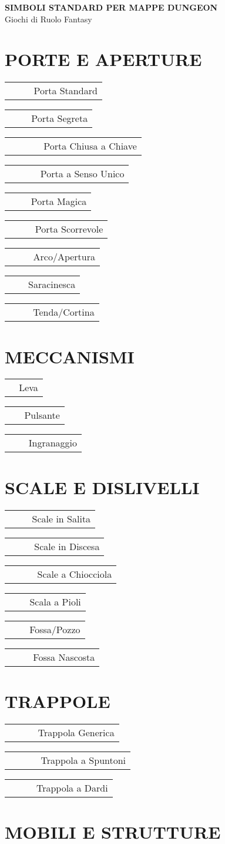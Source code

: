 \documentclass[11pt]{article}
\makeatletter
\newcommand{\mapsymbol}[2][1]{%
  \begin{tikzpicture}[scale=#1, baseline=-0.3ex]
    #2
  \end{tikzpicture}%
}
\newcommand{\legendentry}[2]{%
  \noindent\begin{minipage}{\linewidth}
    \begin{tabular}{@{}c@{\hspace{8pt}}p{0.75\linewidth}@{}}
      \raisebox{-0.3ex}{#1} & #2 \\
    \end{tabular}
  \end{minipage}
  \vspace{3pt}
}
\newcommand{\ddoormagic}{%
  \mapsymbol{
    \draw[very thick] (0,0.5) -- (0.8,0.5);
    \draw[thick] (0.2,0.3) rectangle (0.4,0.7);
    \foreach \angle in {0,60,120,180,240,300} {
      \draw[blue] (0.5,0.5) -- +(\angle:0.06);
    }
  }
}
\newcommand{\ddoorsliding}{%
  \mapsymbol{
    \draw[very thick] (0,0.5) -- (0.8,0.5);
    \draw[thick] (0.2,0.3) rectangle (0.4,0.7);
    \draw[thick,->] (0.5,0.5) -- (0.7,0.5);
    \draw[thick] (0.7,0.3) rectangle (0.8,0.7);
  }
}
\newcommand{\dlever}{%
  \mapsymbol{
    \draw[thick] (0.4,0.3) rectangle (0.6,0.4);
    \draw[very thick] (0.5,0.4) -- (0.45,0.7);
    \fill[black] (0.45,0.7) circle (0.03);
  }
}
\newcommand{\dbutton}{%
  \mapsymbol{
    \draw[thick] (0.45,0.45) circle (0.08);
    \fill[red] (0.45,0.45) circle (0.05);
  }
}
\newcommand{\dgear}{%
  \mapsymbol{
    \draw[thick] (0.5,0.5) circle (0.15);
    \foreach \angle in {0,45,90,135,180,225,270,315} {
      \draw[thick] (0.5,0.5) -- +(\angle:0.18);
      \fill[black] ([shift=(\angle:0.18)] 0.5,0.5) circle (0.02);
    }
  }
}
\newcommand{\ddoorstandard}{%
  \mapsymbol{
    \draw[very thick] (0,0.5) -- (0.8,0.5);
    \draw[thick] (0.2,0.3) rectangle (0.4,0.7);
  }
}
\newcommand{\ddoorsecret}{%
  \mapsymbol{
    \draw[very thick] (0,0.5) -- (0.3,0.5);
    \draw[thick,dashed] (0.3,0.5) -- (0.7,0.5);
    \draw[very thick] (0.7,0.5) -- (1.0,0.5);
  }
}
\newcommand{\ddoorlocked}{%
  \mapsymbol{
    \draw[very thick] (0,0.5) -- (0.8,0.5);
    \draw[thick] (0.2,0.3) rectangle (0.4,0.7);
    \node at (0.5,0.5) {\tiny $\bullet$};
  }
}
\newcommand{\ddooroneway}{%
  \mapsymbol{
    \draw[very thick] (0,0.5) -- (0.6,0.5);
    \draw[thick] (0.2,0.3) rectangle (0.4,0.7);
    \draw[thick,->] (0.6,0.5) -- (0.9,0.5);
  }
}
\newcommand{\darchway}{%
  \mapsymbol{
    \draw[thick] (0.2,0.2) -- (0.2,0.6) arc (180:0:0.3) -- (0.8,0.2);
  }
}
\newcommand{\dportcullis}{%
  \mapsymbol{
    \draw[very thick] (0,0.5) -- (0.3,0.5);
    \foreach \x in {0.4,0.5,0.6,0.7} {
      \draw[thick] (\x,0.2) -- (\x,0.8);
    }
    \draw[very thick] (0.8,0.5) -- (1.1,0.5);
  }
}
\newcommand{\dcurtain}{%
  \mapsymbol{
    \draw[thick] (0.2,0.2) to[bend right=30] (0.3,0.8) to[bend left=30] (0.5,0.2) to[bend right=30] (0.7,0.8) to[bend left=30] (0.8,0.2);
  }
}
\newcommand{\dstairsup}{%
  \mapsymbol{
    \foreach \y in {0.2,0.3,0.4,0.5,0.6,0.7} {
      \draw[thick] (0.2,\y) -- (0.8,\y);
    }
    \draw[thick,->] (0.9,0.3) -- (0.9,0.6);
  }
}
\newcommand{\dstairsdown}{%
  \mapsymbol{
    \foreach \y in {0.2,0.3,0.4,0.5,0.6,0.7} {
      \draw[thick] (0.2,\y) -- (0.8,\y);
    }
    \draw[thick,->] (0.9,0.6) -- (0.9,0.3);
  }
}
\newcommand{\dstairsspiral}{%
  \mapsymbol{
    \draw[thick] (0.5,0.5) circle (0.25);
    \draw[thick] (0.25,0.5) -- (0.75,0.5);
    \draw[thick] (0.5,0.25) -- (0.5,0.75);
    \draw[thick] (0.32,0.32) -- (0.68,0.68);
    \draw[thick] (0.32,0.68) -- (0.68,0.32);
  }
}
\newcommand{\dladder}{%
  \mapsymbol{
    \draw[thick] (0.4,0.2) -- (0.4,0.8);
    \draw[thick] (0.6,0.2) -- (0.6,0.8);
    \foreach \y in {0.3,0.4,0.5,0.6,0.7} {
      \draw[thick] (0.4,\y) -- (0.6,\y);
    }
  }
}
\newcommand{\dpit}{%
  \mapsymbol{
    \fill[black] (0.3,0.3) rectangle (0.7,0.7);
  }
}
\newcommand{\dpitcovered}{%
  \mapsymbol{
    \draw[thick] (0.3,0.3) rectangle (0.7,0.7);
    \draw[thick] (0.3,0.3) -- (0.7,0.7);
    \draw[thick] (0.3,0.7) -- (0.7,0.3);
  }
}
\newcommand{\dtrap}{%
  \mapsymbol{
    \draw[thick] (0.5,0.5) circle (0.2);
    \node at (0.5,0.5) {\small T};
  }
}
\newcommand{\dtrapspikes}{%
  \mapsymbol{
    \draw[thick] (0.3,0.3) rectangle (0.7,0.7);
    \foreach \x in {0.35,0.45,0.55,0.65} {
      \draw[thick] (\x,0.35) -- (\x,0.65);
    }
  }
}
\newcommand{\dtrapdarts}{%
  \mapsymbol{
    \draw[thick] (0.3,0.3) rectangle (0.7,0.7);
    \foreach \x in {0.35,0.5,0.65} {
      \draw[thick,->] (\x,0.35) -- (\x,0.65);
    }
  }
}
\makeatother
\begin{document}
\begin{center}
{\LARGE \textbf{SIMBOLI STANDARD PER MAPPE DUNGEON}}\\
\vspace{0.3cm}
{\large Giochi di Ruolo Fantasy}
\end{center}

\vspace{1cm}

\begin{multicols}{2}
\setlength{\columnseprule}{0.4pt}

\section*{PORTE E APERTURE}

\legendentry{\ddoorstandard}{Porta Standard}
\legendentry{\ddoorsecret}{Porta Segreta}
\legendentry{\ddoorlocked}{Porta Chiusa a Chiave}
\legendentry{\ddooroneway}{Porta a Senso Unico}
\legendentry{\ddoormagic}{Porta Magica}
\legendentry{\ddoorsliding}{Porta Scorrevole}
\legendentry{\darchway}{Arco/Apertura}
\legendentry{\dportcullis}{Saracinesca}
\legendentry{\dcurtain}{Tenda/Cortina}

\section*{MECCANISMI}

\legendentry{\dlever}{Leva}
\legendentry{\dbutton}{Pulsante}
\legendentry{\dgear}{Ingranaggio}

\section*{SCALE E DISLIVELLI}

\legendentry{\dstairsup}{Scale in Salita}
\legendentry{\dstairsdown}{Scale in Discesa}
\legendentry{\dstairsspiral}{Scale a Chiocciola}
\legendentry{\dladder}{Scala a Pioli}
\legendentry{\dpit}{Fossa/Pozzo}
\legendentry{\dpitcovered}{Fossa Nascosta}

\section*{TRAPPOLE}

\legendentry{\dtrap}{Trappola Generica}
\legendentry{\dtrapspikes}{Trappola a Spuntoni}
\legendentry{\dtrapdarts}{Trappola a Dardi}

\section*{MOBILI E STRUTTURE}


\end{multicols}
\end{document}
